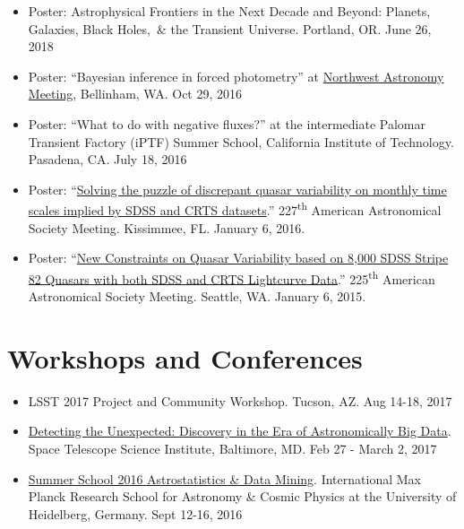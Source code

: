 \documentclass[margin]{res}
\begin{document}
\begin{resume}
\begin{itemize}
\item Poster:    Astrophysical Frontiers in the Next Decade and Beyond: Planets, Galaxies, Black Holes,~\& the Transient Universe. Portland, OR. June 26, 2018 

\item Poster: ``Bayesian inference in forced photometry'' at \href{http://myweb.facstaff.wwu.edu/~davenpj3/nwam2016/}{Northwest Astronomy Meeting}, Bellinham, WA. Oct 29, 2016 

\item Poster: ``What to do with negative fluxes?'' at the intermediate Palomar Transient Factory (iPTF) Summer School, California Institute of Technology.  Pasadena, CA. July 18, 2016

\item Poster: ``\href{http://adsabs.harvard.edu/abs/2016AAS...22724335S}{Solving the puzzle of discrepant quasar variability on monthly time scales implied by SDSS and CRTS datasets}.'' 227\textsuperscript{th} American Astronomical Society Meeting. Kissimmee, FL. January 6, 2016.

\item Poster: ``\href{http://adsabs.harvard.edu/abs/2015AAS...22514464S}{New Constraints on Quasar Variability based on 8,000 SDSS Stripe 82 Quasars with both SDSS and CRTS Lightcurve Data}.'' 225\textsuperscript{th} American Astronomical Society Meeting. Seattle, WA. January 6, 2015.

\end{itemize}


\section{Workshops and Conferences}
\begin{itemize}

    \item LSST 2017 Project and Community Workshop. Tucson, AZ. Aug 14-18, 2017

	\item \href{http://www.cvent.com/events/detecting-the-unexpected-discovery-in-the-era-of-astronomically-big-data/event-summary-0db6808d548b4a9ea6466b43046a1ff5.aspx}{Detecting the Unexpected: Discovery in the Era of Astronomically Big Data}. Space Telescope Science Institute, Baltimore, MD. Feb 27 - March 2, 2017 

	\item \href{https://www.imprs-hd.mpg.de/147422/Summer-School-2016}{Summer School 2016 Astrostatistics \& Data Mining}. International Max Planck Research School for Astronomy \& Cosmic Physics at the University of Heidelberg, Germany. Sept 12-16, 2016


\end{itemize}
\end{resume}
\end{document}
